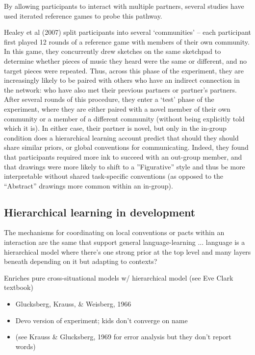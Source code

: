 \documentclass[11pt, floatsintext, man]{apa6}
\begin{document}
By allowing participants to interact with multiple partners, several studies have used iterated reference games to probe this pathway. 

Healey et al (2007) split participants into several `communities' -- each participant first played 12 rounds of a reference game with members of their own community. In this game, they concurrently drew sketches on the same sketchpad to determine whether pieces of music they heard were the same or different, and no target pieces were repeated. Thus, across this phase of the experiment, they are increasingly likely to be paired with others who have an indirect connection in the network: who have also met their previous partners or partner's partners. After several rounds of this procedure, they enter a `test' phase of the experiment, where they are either paired with a novel member of their own community or a member of a different community (without being explicitly told which it is). In either case, their partner is novel, but only in the in-group condition does a hierarchical learning account predict that should they should share similar priors, or global conventions for communicating. Indeed, they found that participants required more ink to succeed with an out-group member, and that drawings were more likely to shift to a ''Figurative'' style and thus be more interpretable without shared task-specific conventions (as opposed to the ``Abstract'' drawings more common within an in-group). 

\subsection{Hierarchical learning in development}

The mechanisms for coordinating on local conventions or pacts within an interaction are the same that support general language-learning
... language is a hierarchical model where there's one strong prior at the top level and many layers beneath depending on it but adapting to contexts?

Enriches pure cross-situational models w/ hierarchical model (see Eve Clark textbook)

\begin{itemize}
\item Glucksberg, Krauss, \& Weisberg, 1966
\item Devo version of experiment; kids don't converge on name
\item (see Krauss \& Glucksberg, 1969 for error analysis but they don't report words)
\end{itemize}
\end{document}
